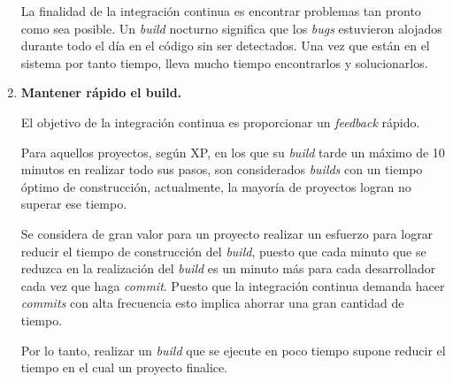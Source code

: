 \begin{enumerate}
La finalidad de la integración continua es encontrar problemas tan pronto como sea posible. Un \textit{build} nocturno significa que los \textit{bugs} estuvieron alojados durante todo el día en el código sin ser detectados. Una vez que están en el sistema por tanto tiempo, lleva mucho tiempo encontrarlos y solucionarlos.


\clearpage 

\item \textbf{Mantener rápido el build.}

El objetivo de la integración continua es proporcionar un \textit{feedback} rápido. %

Para aquellos proyectos, según \ac{XP}, en los que su \textit{build} tarde un máximo de 10 minutos en realizar todo sus pasos, son considerados \textit{builds} con un tiempo óptimo de construcción, actualmente, la mayoría de proyectos logran no superar ese tiempo.

Se considera de gran valor para un proyecto realizar un esfuerzo para lograr reducir el tiempo de construcción del \textit{build}, puesto que cada minuto que se reduzca en la realización del \textit{build} es un minuto más para cada desarrollador cada vez que haga \textit{commit}. Puesto que la integración continua demanda hacer \textit{commits} con alta frecuencia esto implica ahorrar una gran cantidad de tiempo.

Por lo tanto, realizar un \textit{build} que se ejecute en poco tiempo supone reducir el tiempo en el cual un proyecto finalice.



\end{enumerate}

